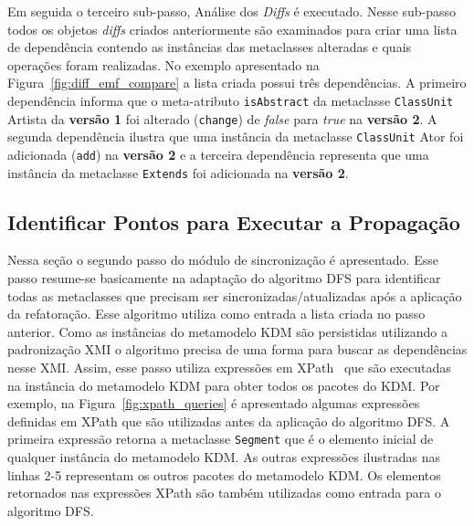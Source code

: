 

Em seguida o terceiro sub-passo, Análise dos \textit{Diffs} é executado. Nesse sub-passo todos os objetos \textit{diffs} criados anteriormente são examinados para criar uma lista de dependência contendo as instâncias das metaclasses alteradas e quais operações foram realizadas. No exemplo apresentado na Figura~\ref{fig:diff_emf_compare} a lista criada possui três dependências. A primeiro dependência informa que o meta-atributo \texttt{isAbstract} da metaclasse \texttt{ClassUnit} Artista da \textbf{versão 1} foi alterado (\texttt{change}) de \textit{false} para \textit{true} na \textbf{versão 2}. A segunda dependência ilustra que uma instância da metaclasse \texttt{ClassUnit} Ator foi adicionada (\texttt{add}) na \textbf{versão 2} e a terceira dependência representa que uma instância da metaclasse \texttt{Extends} foi adicionada na \textbf{versão 2}.


\subsection{Identificar Pontos para Executar a Propagação}\label{subsec:identificandoPontoParaExecutarApropagacao}

Nessa seção o segundo passo do módulo de sincronização é apresentado. Esse passo resume-se basicamente na adaptação do algoritmo DFS para identificar todas as metaclasses que precisam ser sincronizadas/atualizadas após a aplicação da refatoração. Esse algoritmo utiliza como entrada a lista criada no passo anterior. Como as instâncias do metamodelo KDM são persistidas utilizando a padronização XMI o algoritmo precisa de uma forma para buscar as dependências nesse XMI. Assim, esse passo utiliza expressões em XPath~\cite{kay2011xslt} que são executadas na instância do metamodelo KDM para obter todos os pacotes do KDM. Por exemplo, na Figura~\ref{fig:xpath_queries} é apresentado algumas expressões definidas em XPath que são utilizadas antes da aplicação do algoritmo DFS. A primeira expressão retorna a metaclasse \texttt{Segment} que é o elemento inicial de qualquer instância do metamodelo KDM. As outras expressões ilustradas nas linhas 2-5 representam os outros pacotes do metamodelo KDM. Os elementos retornados nas expressões XPath são também utilizadas como entrada para o algoritmo DFS.

